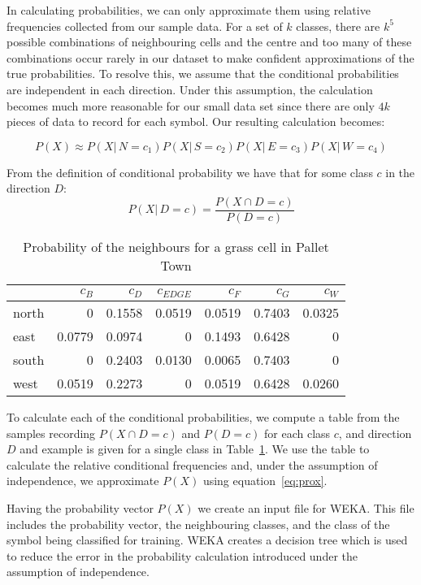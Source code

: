 In calculating probabilities, we can only approximate them using relative
frequencies collected from our sample data. For a set of $k$ classes, there are
$k^5$ possible combinations of neighbouring cells and the centre and too many
of these combinations occur rarely in our dataset to make confident
approximations of the true probabilities. To resolve this, we assume that the
conditional probabilities are independent in each direction. Under this
assumption, the calculation becomes much more reasonable for our small data set
since there are only $4k$ pieces of data to record for each symbol.  Our
resulting calculation becomes:

\begin{equation} \label{eq:prox}
P(X) \approx P(X|\,N\!=\!c_1)P(X|\,S\!=\!c_2)P(X|\,E\!=\!c_3)P(X|\,W\!=\!c_4)
\end{equation}

From the definition of conditional probability we have that for some class $c$ in
the direction $D$:
\[ P(X|\,D\!=\!c) = \frac{P(X \cap D\!=\!c)}{P(D=c)} \]

\begin{table}[h]
\label{table:relativefreq}
\begin{center}
\begin{tabular}{ l | r r r r r r }
              & $c_{B}$& $c_{D}$& $c_{EDGE}$& $c_{F}$& $c_{G}$& $c_{W}$ \\ 
              \hline
    north     & 0      & 0.1558 & 0.0519    & 0.0519 & 0.7403 & 0.0325\\
    east      & 0.0779 & 0.0974 & 0         & 0.1493 & 0.6428 & 0\\
    south     & 0      & 0.2403 & 0.0130    & 0.0065 & 0.7403 & 0\\
    west      & 0.0519 & 0.2273 & 0         & 0.0519 & 0.6428 & 0.0260\\
\end{tabular}
\caption{Probability of the neighbours for a grass cell in Pallet Town}
\end{center}
\end{table}


To calculate each of the conditional probabilities, we compute a table from the
samples recording $P(X\cap D\!=\!c)$ and $P(D\!=\!c)$ for each class  $c$, and
direction $D$ and example is given for a single class in
Table~\ref{table:relativefreq}.  We use the table to calculate the relative
conditional frequencies and, under the assumption of independence, we
approximate $P(X)$ using equation~\ref{eq:prox}.

Having the probability vector $P(X)$ we create an input file for WEKA.  This
file includes the probability vector, the neighbouring classes, and the class
of the symbol being classified for training. WEKA creates a decision tree which
is used to reduce the error in the probability calculation introduced under the
assumption of independence.

